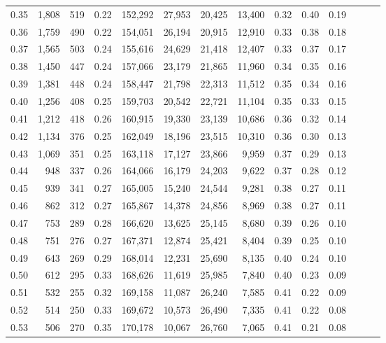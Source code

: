 \begin{tabular}{rrrrrrrrrrrrrr}
0.35 &  1,808 &  519 &  0.22 &  152,292 &   27,953 &  20,425 &  13,400 &  0.32 &  0.40 &      0.19 \\
0.36 &  1,759 &  490 &  0.22 &  154,051 &   26,194 &  20,915 &  12,910 &  0.33 &  0.38 &      0.18 \\
0.37 &  1,565 &  503 &  0.24 &  155,616 &   24,629 &  21,418 &  12,407 &  0.33 &  0.37 &      0.17 \\
0.38 &  1,450 &  447 &  0.24 &  157,066 &   23,179 &  21,865 &  11,960 &  0.34 &  0.35 &      0.16 \\
0.39 &  1,381 &  448 &  0.24 &  158,447 &   21,798 &  22,313 &  11,512 &  0.35 &  0.34 &      0.16 \\
0.40 &  1,256 &  408 &  0.25 &  159,703 &   20,542 &  22,721 &  11,104 &  0.35 &  0.33 &      0.15 \\
0.41 &  1,212 &  418 &  0.26 &  160,915 &   19,330 &  23,139 &  10,686 &  0.36 &  0.32 &      0.14 \\
0.42 &  1,134 &  376 &  0.25 &  162,049 &   18,196 &  23,515 &  10,310 &  0.36 &  0.30 &      0.13 \\
0.43 &  1,069 &  351 &  0.25 &  163,118 &   17,127 &  23,866 &   9,959 &  0.37 &  0.29 &      0.13 \\
0.44 &    948 &  337 &  0.26 &  164,066 &   16,179 &  24,203 &   9,622 &  0.37 &  0.28 &      0.12 \\
0.45 &    939 &  341 &  0.27 &  165,005 &   15,240 &  24,544 &   9,281 &  0.38 &  0.27 &      0.11 \\
0.46 &    862 &  312 &  0.27 &  165,867 &   14,378 &  24,856 &   8,969 &  0.38 &  0.27 &      0.11 \\
0.47 &    753 &  289 &  0.28 &  166,620 &   13,625 &  25,145 &   8,680 &  0.39 &  0.26 &      0.10 \\
0.48 &    751 &  276 &  0.27 &  167,371 &   12,874 &  25,421 &   8,404 &  0.39 &  0.25 &      0.10 \\
0.49 &    643 &  269 &  0.29 &  168,014 &   12,231 &  25,690 &   8,135 &  0.40 &  0.24 &      0.10 \\
0.50 &    612 &  295 &  0.33 &  168,626 &   11,619 &  25,985 &   7,840 &  0.40 &  0.23 &      0.09 \\
0.51 &    532 &  255 &  0.32 &  169,158 &   11,087 &  26,240 &   7,585 &  0.41 &  0.22 &      0.09 \\
0.52 &    514 &  250 &  0.33 &  169,672 &   10,573 &  26,490 &   7,335 &  0.41 &  0.22 &      0.08 \\
0.53 &    506 &  270 &  0.35 &  170,178 &   10,067 &  26,760 &   7,065 &  0.41 &  0.21 &      0.08 \\

\end{tabular}
